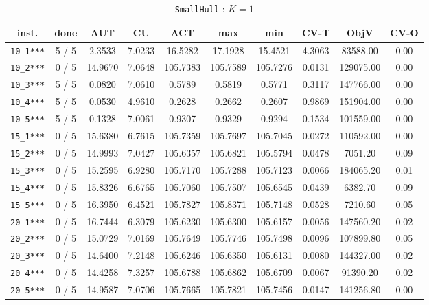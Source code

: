 \begin{table}[h!]
\begin{center}
\small
\begin{tabular}{| c | c | c | c | c | c | c | c | c | c |}
\hline
inst. & done & AUT & CU & ACT & max & min & CV-T & ObjV & CV-O \\
\hline
\verb|10_1***| & 5 / 5 & 2.3533 & 7.0233 & 16.5282 & 17.1928 & 15.4521 & 4.3063 & 83588.00 & 0.00\\ 
\verb|10_2***| & 0 / 5 & 14.9670 & 7.0648 & 105.7383 & 105.7589 & 105.7276 & 0.0131 & 129075.00 & 0.00\\ 
\verb|10_3***| & 5 / 5 & 0.0820 & 7.0610 & 0.5789 & 0.5819 & 0.5771 & 0.3117 & 147766.00 & 0.00\\ 
\verb|10_4***| & 5 / 5 & 0.0530 & 4.9610 & 0.2628 & 0.2662 & 0.2607 & 0.9869 & 151904.00 & 0.00\\ 
\verb|10_5***| & 5 / 5 & 0.1328 & 7.0061 & 0.9307 & 0.9329 & 0.9294 & 0.1534 & 101559.00 & 0.00\\ 
\verb|15_1***| & 0 / 5 & 15.6380 & 6.7615 & 105.7359 & 105.7697 & 105.7045 & 0.0272 & 110592.00 & 0.00\\ 
\verb|15_2***| & 0 / 5 & 14.9993 & 7.0427 & 105.6357 & 105.6821 & 105.5794 & 0.0478 & 7051.20 & 0.09\\ 
\verb|15_3***| & 0 / 5 & 15.2595 & 6.9280 & 105.7170 & 105.7288 & 105.7123 & 0.0066 & 184065.20 & 0.01\\ 
\verb|15_4***| & 0 / 5 & 15.8326 & 6.6765 & 105.7060 & 105.7507 & 105.6545 & 0.0439 & 6382.70 & 0.09\\ 
\verb|15_5***| & 0 / 5 & 16.3950 & 6.4521 & 105.7827 & 105.8371 & 105.7148 & 0.0528 & 7210.60 & 0.05\\ 
\verb|20_1***| & 0 / 5 & 16.7444 & 6.3079 & 105.6230 & 105.6300 & 105.6157 & 0.0056 & 147560.20 & 0.02\\ 
\verb|20_2***| & 0 / 5 & 15.0729 & 7.0169 & 105.7649 & 105.7746 & 105.7498 & 0.0096 & 107899.80 & 0.05\\ 
\verb|20_3***| & 0 / 5 & 14.6400 & 7.2148 & 105.6246 & 105.6350 & 105.6131 & 0.0080 & 144327.00 & 0.02\\ 
\verb|20_4***| & 0 / 5 & 14.4258 & 7.3257 & 105.6788 & 105.6862 & 105.6709 & 0.0067 & 91390.20 & 0.02\\ 
\verb|20_5***| & 0 / 5 & 14.9587 & 7.0706 & 105.7665 & 105.7821 & 105.7456 & 0.0147 & 141256.80 & 0.00\\ 
\hline
\end{tabular}
\caption{\texttt{SmallHull} : $K = 1$}
\label{table:hull:1}
\end{center}
\end{table}

